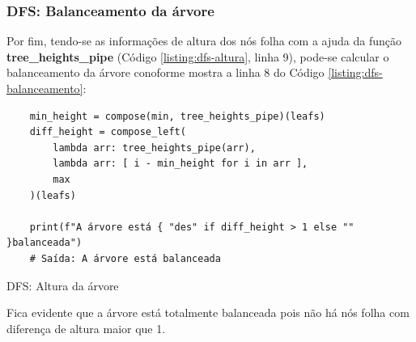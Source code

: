 \subsubsection{DFS: Balanceamento da árvore}

Por fim, tendo-se as informações de altura dos nós folha com a ajuda da função \textbf{tree\_heights\_pipe} (Código \ref{listing:dfs-altura}, linha 9),
pode-se calcular o balanceamento da árvore conoforme mostra a linha 8 do Código \ref{listing:dfs-balanceamento}:

\begin{listing}[H]
    \begin{verbatim}
    min_height = compose(min, tree_heights_pipe)(leafs)
    diff_height = compose_left(
        lambda arr: tree_heights_pipe(arr),
        lambda arr: [ i - min_height for i in arr ],
        max
    )(leafs)

    print(f"A árvore está { "des" if diff_height > 1 else "" }balanceada")
    # Saída: A árvore está balanceada
    \end{verbatim}
    \caption{DFS: Altura da árvore}
    \label{listing:dfs-balanceamento}
\end{listing}

Fica evidente que a árvore está totalmente balanceada pois não há nós folha com diferença de altura maior que 1.

